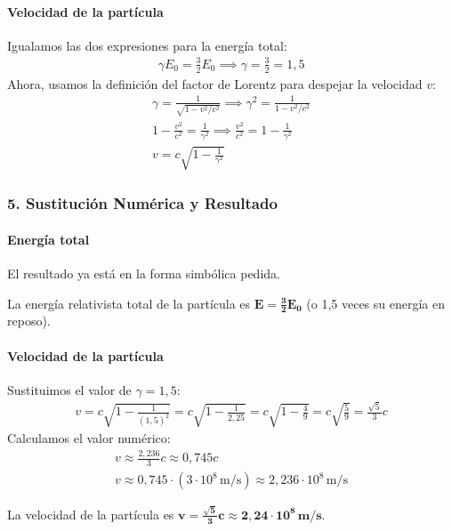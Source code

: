 \paragraph{Velocidad de la partícula}
Igualamos las dos expresiones para la energía total:
\begin{gather}
    \gamma E_0 = \frac{3}{2}E_0 \implies \gamma = \frac{3}{2} = 1,5
\end{gather}
Ahora, usamos la definición del factor de Lorentz para despejar la velocidad $v$:
\begin{gather}
    \gamma = \frac{1}{\sqrt{1-v^2/c^2}} \implies \gamma^2 = \frac{1}{1-v^2/c^2} \\
    1-\frac{v^2}{c^2} = \frac{1}{\gamma^2} \implies \frac{v^2}{c^2} = 1 - \frac{1}{\gamma^2} \\
    v = c \sqrt{1 - \frac{1}{\gamma^2}}
\end{gather}

\subsubsection*{5. Sustitución Numérica y Resultado}
\paragraph{Energía total}
El resultado ya está en la forma simbólica pedida.
\begin{cajaresultado}
La energía relativista total de la partícula es $\boldsymbol{E = \frac{3}{2} E_0}$ (o 1,5 veces su energía en reposo).
\end{cajaresultado}
\paragraph{Velocidad de la partícula}
Sustituimos el valor de $\gamma=1,5$:
\begin{gather}
    v = c \sqrt{1 - \frac{1}{(1,5)^2}} = c \sqrt{1 - \frac{1}{2,25}} = c \sqrt{1 - \frac{4}{9}} = c \sqrt{\frac{5}{9}} = \frac{\sqrt{5}}{3}c
\end{gather}
Calculamos el valor numérico:
\begin{gather}
    v \approx \frac{2,236}{3} c \approx 0,745 c \\
    v \approx 0,745 \cdot (3\cdot10^8 \, \text{m/s}) \approx 2,236 \cdot 10^8 \, \text{m/s}
\end{gather}
\begin{cajaresultado}
La velocidad de la partícula es $\boldsymbol{v = \frac{\sqrt{5}}{3}c \approx 2,24 \cdot 10^8 \, \textbf{m/s}}$.
\end{cajaresultado}

